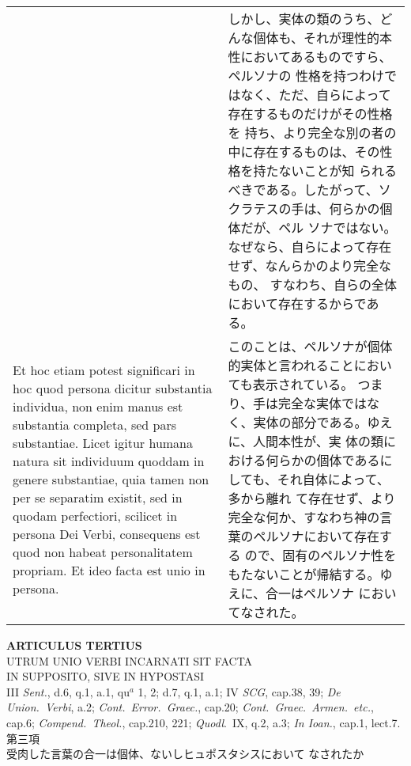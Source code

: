 \documentclass[10pt]{jsarticle} %
\begin{document}
\begin{longtable}{p{21em}p{21em}}
&

しかし、実体の類のうち、どんな個体も、それが理性的本性においてあるものですら、ペルソナの
 性格を持つわけではなく、ただ、自らによって存在するものだけがその性格を
 持ち、より完全な別の者の中に存在するものは、その性格を持たないことが知
 られるべきである。したがって、ソクラテスの手は、何らかの個体だが、ペル
 ソナではない。なぜなら、自らによって存在せず、なんらかのより完全なもの、
 すなわち、自らの全体において存在するからである。


\\


Et hoc etiam potest
significari in hoc quod persona dicitur substantia individua, non enim
manus est substantia completa, sed pars substantiae. Licet igitur humana
natura sit individuum quoddam in genere substantiae, quia tamen non per
se separatim existit, sed in quodam perfectiori, scilicet in persona Dei
Verbi, consequens est quod non habeat personalitatem propriam. Et ideo
facta est unio in persona.


&

このことは、ペルソナが個体的実体と言われることにおいても表示されている。
つまり、手は完全な実体ではなく、実体の部分である。ゆえに、人間本性が、実
 体の類における何らかの個体であるにしても、それ自体によって、多から離れ
 て存在せず、より完全な何か、すなわち神の言葉のペルソナにおいて存在する
 ので、固有のペルソナ性をもたないことが帰結する。ゆえに、合一はペルソナ
 においてなされた。


\end{longtable}
\newpage





\begin{center}
 {\Large {\bf ARTICULUS TERTIUS}}\\
 {\large UTRUM UNIO VERBI INCARNATI SIT FACTA \\IN SUPPOSITO, SIVE IN HYPOSTASI}\\
 {\footnotesize III {\itshape Sent.}, d.6, q.1, a.1, qu$^a$ 1, 2; d.7,
 q.1, a.1; IV {\itshape SCG}, cap.38, 39; {\itshape De Union.~Verbi},
 a.2; {\itshape Cont.~Error.~Graec.}, cap.20; {\itshape
 Cont.~Graec.~Armen.~etc.}, cap.6; {\itshape Compend.~Theol.}, cap.210,
 221; {\itshape Quodl}.~IX, q.2, a.3; {\itshape In Ioan.}, cap.1, lect.7.}\\
 {\Large 第三項\\受肉した言葉の合一は個体、ないしヒュポスタシスにおいて
 なされたか}
\end{center}
\end{document}
